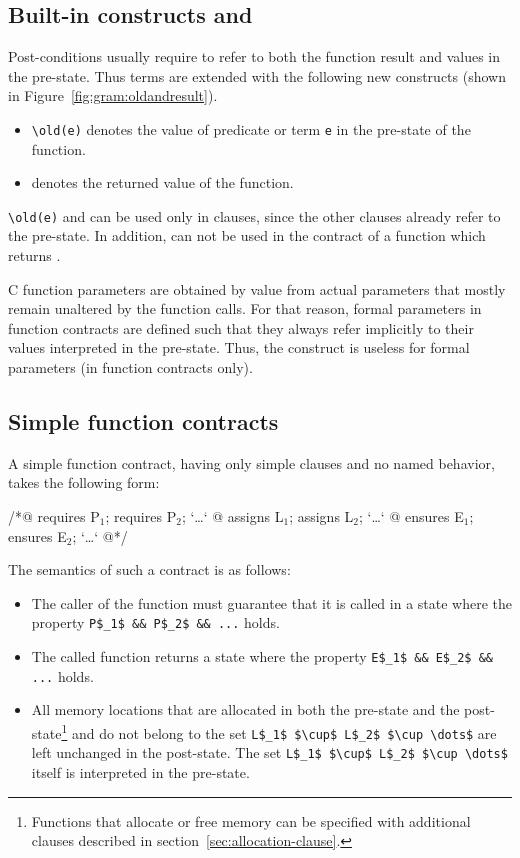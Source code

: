 \subsection{Built-in constructs %
  \texorpdfstring{\old}{\textbackslash{}old} %
 and \texorpdfstring{\result}{\textbackslash{}result}}

Post-conditions usually require to refer to both the function result and
values in the pre-state. Thus terms are extended with the following new
constructs (shown in Figure~\ref{fig:gram:oldandresult}).
\begin{itemize}
\item \lstinline|\old(e)| denotes the value of
  predicate or term \lstinline|e| in the pre-state of the function.
\item \result{} denotes the returned value of the function.
\end{itemize}
\lstinline|\old(e)| and \result{} can be used only in \ensures{} clauses, since
the other clauses already refer to the pre-state. In addition,
\result{} can not be used in the contract of a function which returns
\void{}.

C function parameters are obtained by
value from actual parameters that mostly remain unaltered by the
function calls. For that reason, formal parameters in function
contracts are defined such that they always refer implicitly to their
values interpreted in the pre-state.
Thus, the \old construct is useless for formal parameters (in
function contracts only).

\subsection{Simple function contracts}
\label{sec:simplecontracts}

A simple function contract, having only simple clauses and no named behavior, takes the following
form:
\begin{listing}{1}
/*@ requires P$_1$; requires P$_2$; `\dots`
  @ assigns L$_1$;  assigns L$_2$;  `\dots`
  @ ensures E$_1$;  ensures E$_2$;  `\dots`
  @*/
\end{listing}
The semantics of such a contract is as follows:
\begin{itemize}
\item The caller of the function must guarantee that it is called in a
  state where the property \lstinline|P$_1$ && P$_2$ && ...| holds.
\item The called function returns a state where the property
  \lstinline|E$_1$ && E$_2$ && ...| holds.
\item All memory locations that are allocated in both the pre-state and 
  the post-state\footnote{Functions that allocate or free memory can be 
    specified with additional clauses described in
    section~\ref{sec:allocation-clause}.} 
  and do not belong to the
  set \lstinline|L$_1$ $\cup$ L$_2$ $\cup \dots$| are left unchanged in the
  post-state. The set \lstinline|L$_1$ $\cup$ L$_2$ $\cup \dots$| 
  itself is interpreted in the pre-state.
\end{itemize}

